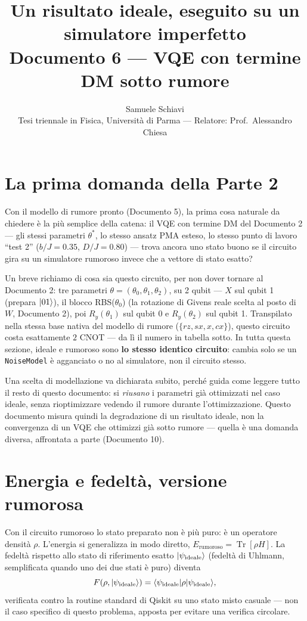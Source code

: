 \documentclass[11pt,a4paper]{article}
\title{\bfseries Un risultato ideale, eseguito su un simulatore imperfetto\\[2pt]
\large Documento 6 --- VQE con termine DM sotto rumore}
\author{Samuele Schiavi \\ \small Tesi triennale in Fisica, Università di Parma
--- Relatore: Prof.\ Alessandro Chiesa}
\date{}
\newcommand{\Tr}{\operatorname{Tr}}
\begin{document}
\maketitle
\thispagestyle{fancy}

\section{La prima domanda della Parte 2}

Con il modello di rumore pronto (Documento 5), la prima cosa naturale da
chiedere è la più semplice della catena: il VQE con termine DM del Documento
2 --- gli stessi parametri $\theta^*$, lo stesso ansatz PMA esteso, lo
stesso punto di lavoro ``test 2'' ($b/J=0.35$, $D/J=0.80$) --- trova ancora
uno stato buono se il circuito gira su un simulatore rumoroso invece che a
vettore di stato esatto?

Un breve richiamo di cosa sia questo circuito, per non dover tornare al
Documento 2: tre parametri $\theta=(\theta_0,\theta_1,\theta_2)$, su 2
qubit --- $X$ sul qubit 1 (prepara $\lvert 01\rangle$), il blocco RBS($\theta_0$)
(la rotazione di Givens reale scelta al posto di $W$, Documento 2), poi
$R_y(\theta_1)$ sul qubit 0 e $R_y(\theta_2)$ sul qubit 1. Transpilato nella
stessa base nativa del modello di rumore ($\{rz,sx,x,cx\}$), questo
circuito costa esattamente $2$ CNOT --- da lì il numero in tabella sotto.
In tutta questa sezione, ideale e rumoroso sono \textbf{lo stesso identico
circuito}: cambia solo se un \texttt{NoiseModel} è agganciato o no al
simulatore, non il circuito stesso.

Una scelta di modellazione va dichiarata subito, perché guida come leggere
tutto il resto di questo documento: si \emph{riusano} i parametri già
ottimizzati nel caso ideale, senza rioptimizzare vedendo il rumore durante
l'ottimizzazione. Questo documento misura quindi la degradazione di un
risultato ideale, non la convergenza di un VQE che ottimizzi già sotto
rumore --- quella è una domanda diversa, affrontata a parte (Documento 10).

\section{Energia e fedeltà, versione rumorosa}

Con il circuito rumoroso lo stato preparato non è più puro: è un operatore
densità $\rho$. L'energia si generalizza in modo diretto,
$E_\text{rumoroso}=\Tr[\rho H]$. La fedeltà rispetto allo stato di riferimento
esatto $\lvert \psi_\text{ideale}\rangle$ (fedeltà di Uhlmann, semplificata quando uno
dei due stati è puro) diventa
\begin{equation}
F(\rho,\lvert \psi_\text{ideale}\rangle) = \langle \psi_\text{ideale} \rvert\rho\lvert \psi_\text{ideale}\rangle,
\end{equation}
verificata contro la routine standard di Qiskit su uno stato misto casuale ---
non il caso specifico di questo problema, apposta per evitare una verifica
circolare.
\end{document}
